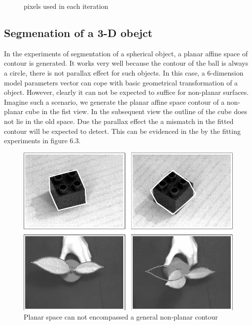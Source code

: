 \begin{figure}
\begin{minipage}[t]{0.45\linewidth}
  \end{minipage} 
  \begin{minipage}[t]{0.45\linewidth} 
    \centering 
  \end{minipage} 
\caption{pixels used in each iteration}
\end{figure}



\subsection{Segmenation of a 3-D obejct}
\label{sec:s3o}
In the experiments of segmentation of a spherical object, a planar
affine space of contour is generated. It works very well because the
contour of the ball is always a circle, there is not parallax effect
for such objects. In this case, a 6-dimension model parameters vector
can cope with basic geometrical transformation of a object. However,
clearly it can not be expected to suffice for non-planar
surfaces. Imagine such a scenario, we generate the  planar affine
space contour of a non-planar cube in the fist view. In the
subsequent view the outline of the cube does not lie in the old
space. Due the parallax effect the a mismatch in the fitted contour
will be expected to detect. This can be evidenced in the by the
fitting experiments in figure 6.3.
\begin{figure}[htbp]
  \centering
    \centering 
    \includegraphics[width=\linewidth]{images/mismatch.png}
  \caption{Planar space can not encompassed a general non-planar contour}
\end{figure}


